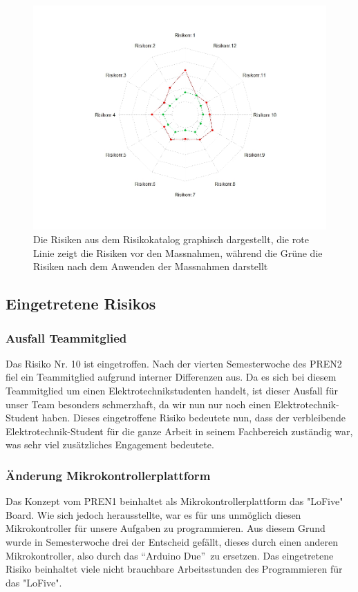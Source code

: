 \documentclass[a4paper]{report}
\begin{document}
\begin{figure}[h!]
	\centering
	\includegraphics[width=\textwidth,keepaspectratio]{Risikomatrix_Spinne}
	\caption{Die Risiken aus dem Risikokatalog graphisch dargestellt, die rote Linie zeigt die Risiken vor den Massnahmen, während die Grüne die Risiken nach dem Anwenden der Massnahmen darstellt}
	\label{fig:Risikomatrix_Spinne}
\end{figure}

\subsection{Eingetretene Risikos}
\label{ch:EingetreteneRisikos}
\subsubsection{Ausfall Teammitglied}
Das Risiko Nr. 10 ist eingetroffen. Nach der vierten Semesterwoche des PREN2 fiel ein Teammitglied aufgrund interner Differenzen aus. Da es sich bei diesem Teammitglied um einen Elektrotechnikstudenten handelt, ist dieser Ausfall für unser Team besonders schmerzhaft, da wir nun nur noch einen Elektrotechnik-Student haben. Dieses eingetroffene Risiko bedeutete nun, dass der verbleibende Elektrotechnik-Student für die ganze Arbeit in seinem Fachbereich zuständig war, was sehr viel zusätzliches Engagement bedeutete.

\subsubsection{Änderung Mikrokontrollerplattform}
\label{ch:AenderungMikrokontroller}
Das Konzept vom PREN1 beinhaltet als Mikrokontrollerplattform das "LoFive" Board. Wie sich jedoch herausstellte, war es für uns unmöglich diesen Mikrokontroller für unsere Aufgaben zu programmieren. Aus diesem Grund wurde in Semesterwoche drei der Entscheid gefällt, dieses durch einen anderen Mikrokontroller, also durch das \textquotedblleft Arduino Due\textquotedblright\ zu ersetzen. Das eingetretene Risiko beinhaltet viele nicht brauchbare Arbeitsstunden des Programmieren für das "LoFive".
\end{document}
